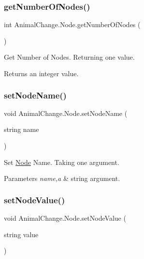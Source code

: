 \subsubsection{\texorpdfstring{getNumberOfNodes()}{getNumberOfNodes()}}
{\footnotesize\ttfamily int Animal\+Change.\+Node.\+get\+Number\+Of\+Nodes (\begin{DoxyParamCaption}{ }\end{DoxyParamCaption})\hspace{0.3cm}{\ttfamily [inline]}}



Get Number of Nodes. Returning one value. 

\begin{DoxyReturn}{Returns}
an integer value. 
\end{DoxyReturn}
\mbox{\label{class_animal_change_1_1_node_ae8b113588ec6ba334170ee22418950ec}} 
\subsubsection{\texorpdfstring{setNodeName()}{setNodeName()}}
{\footnotesize\ttfamily void Animal\+Change.\+Node.\+set\+Node\+Name (\begin{DoxyParamCaption}\item[{string}]{name }\end{DoxyParamCaption})\hspace{0.3cm}{\ttfamily [inline]}}



Set \mbox{\hyperlink{class_animal_change_1_1_node}{Node}} Name. Taking one argument. 


\begin{DoxyParams}{Parameters}
{\em name,a} & string argument. \\
\hline
\end{DoxyParams}
\mbox{\label{class_animal_change_1_1_node_a26766ab5a8c12f560f96ce7253273b77}} 
\subsubsection{\texorpdfstring{setNodeValue()}{setNodeValue()}}
{\footnotesize\ttfamily void Animal\+Change.\+Node.\+set\+Node\+Value (\begin{DoxyParamCaption}\item[{string}]{value }\end{DoxyParamCaption})\hspace{0.3cm}{\ttfamily [inline]}}



